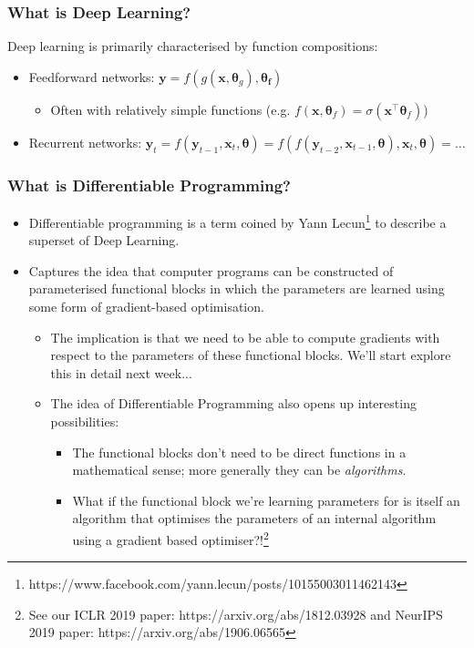 \documentclass[\beamerclass]{beamer}
\begin{document}
\begin{frame}
\frametitle{What is Deep Learning?}

Deep learning is primarily characterised by function compositions: \\ \vspace{10mm}
\begin{itemize}
	\item<2-> Feedforward networks: $\bm{y} = f (g(\bm{x}, \bm\theta_g), \bm{\theta_f})$
	\begin{itemize}
		\item Often with relatively simple functions (e.g. $f(\bm x, \bm{\theta}_f) = \sigma(\bm{x}^\top \bm{\theta}_f)$)
	\end{itemize} \vspace{3mm}
	\item<3-> Recurrent networks: $\bm y_t = f(\bm y_{t-1}, \bm x_t, \bm\theta) = f(f(\bm y_{t-2}, \bm x_{t-1}, \bm\theta), \bm x_t, \bm\theta) = \dots$
\end{itemize}
\vspace{10mm}


\end{frame}

\begin{frame}
\frametitle{What is Differentiable Programming?}
	
\begin{itemize}
	\item<+-> Differentiable programming is a term coined by Yann Lecun\footnote{https://www.facebook.com/yann.lecun/posts/10155003011462143} to describe a superset of Deep Learning.
	\item<+-> Captures the idea that computer programs can be constructed of parameterised functional blocks in which the parameters are learned using some form of gradient-based optimisation.
	\begin{itemize}
		\item<+-> The implication is that we need to be able to compute gradients with respect to the parameters of these functional blocks. We'll start explore this in detail next week...
		\item<+-> The idea of Differentiable Programming also opens up interesting possibilities: 
		\begin{itemize}
			\item The functional blocks don't need to be direct functions in a mathematical sense; more generally they can be \emph{algorithms}.
			\item What if the functional block we're learning parameters for is itself an algorithm that optimises the parameters of an internal algorithm using a gradient based optimiser?!\footnote{See our ICLR 2019 paper: https://arxiv.org/abs/1812.03928 and NeurIPS 2019 paper: https://arxiv.org/abs/1906.06565}
		\end{itemize}
	\end{itemize}
\end{itemize}
\end{frame}
\end{document}
